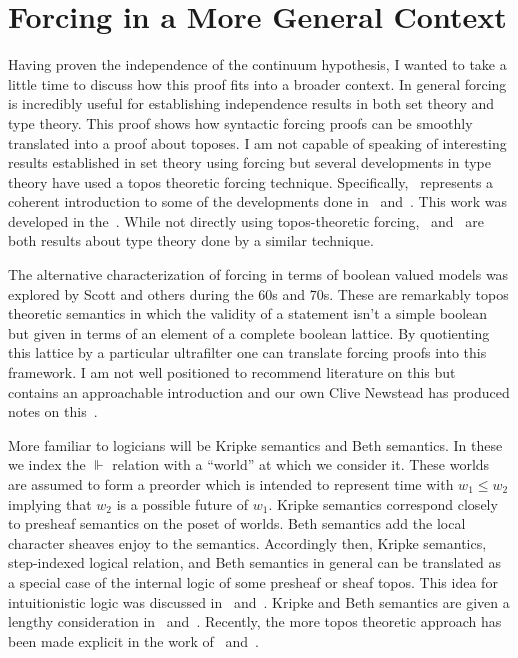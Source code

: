 \section{Forcing in a More General Context}\label{sec:conclusion}

Having proven the independence of the continuum hypothesis, I wanted
to take a little time to discuss how this proof fits into a broader
context. In general forcing is incredibly useful for establishing
independence results in both set theory and type theory. This proof
shows how syntactic forcing proofs can be smoothly translated into a
proof about toposes. I am not capable of speaking of interesting
results established in set theory using forcing but several
developments in type theory have used a topos theoretic forcing
technique. Specifically,~\citet{Coquand:12} represents a coherent
introduction to some of the developments done in~\citet{Coquand:04}
and~\citet{Coquand:16}. This work was developed in
the~\citet{Jaber:14}. While not directly using topos-theoretic
forcing,~\citet{Escardo:13} and~\citet{Sterling:16} are both results
about type theory done by a similar technique.

The alternative characterization of forcing in terms of boolean valued
models was explored by Scott and others during the 60s and 70s. These
are remarkably topos theoretic semantics in which the validity of a
statement isn't a simple boolean but given in terms of an element of a
complete boolean lattice. By quotienting this lattice by a particular
ultrafilter one can translate forcing proofs into this framework. I am
not well positioned to recommend literature on this
but~\citet{Jech:08} contains an approachable introduction and our own
Clive Newstead has produced notes on this~\cite{Newstead:12}.

More familiar to logicians will be Kripke semantics and Beth
semantics. In these we index the $\Vdash$ relation with a ``world'' at
which we consider it. These worlds are assumed to form a preorder
which is intended to represent time with $w_1 \le w_2$ implying that
$w_2$ is a possible future of $w_1$. Kripke semantics correspond
closely to presheaf semantics on the poset of worlds. Beth semantics
add the local character sheaves enjoy to the semantics. Accordingly
then, Kripke semantics, step-indexed logical relation, and Beth
semantics in general can be translated as a special case of the
internal logic of some presheaf or sheaf topos. This idea for
intuitionistic logic was discussed in~\citet{Fourman:82}
and~\citet{Fourman:13}. Kripke and Beth semantics are given a lengthy
consideration in~\citet{Dummett:00}
and~\citet{Troelstra:88}. Recently, the more topos theoretic approach
has been made explicit in the work of~\citet{Birkedal:11}
and~\citet{Dreyer:09}.
